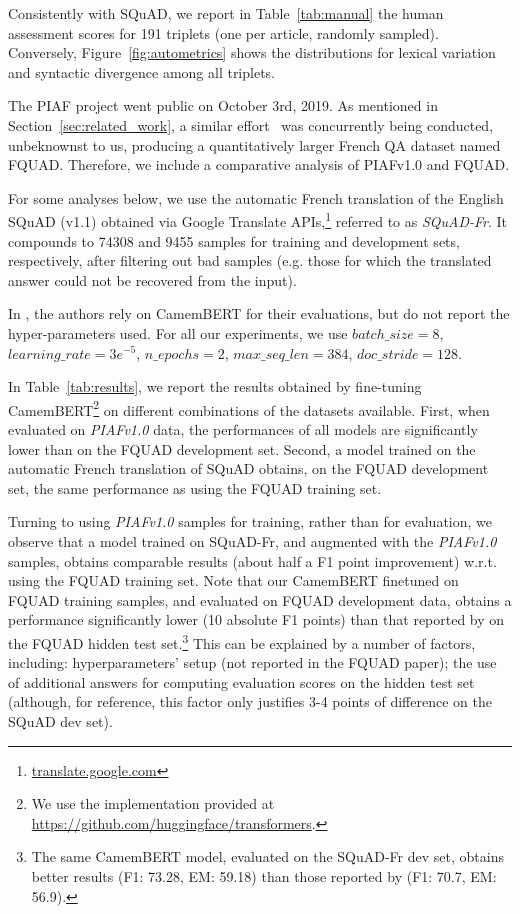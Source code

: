 \documentclass[10pt, a4paper]{article}
\begin{document}
Consistently with SQuAD, we report in Table~\ref{tab:manual}  the human assessment scores for 191 triplets (one per article, randomly sampled). Conversely, Figure~\ref{fig:autometrics} shows the distributions for lexical variation and syntactic divergence among all triplets.

The PIAF project went public on October 3rd, 2019. As mentioned in Section~\ref{sec:related_work}, a similar effort~\cite{d2020fquad} was concurrently being conducted, unbeknownst to us, producing a quantitatively larger French QA dataset named FQUAD. Therefore, we include a comparative analysis of PIAFv1.0 and FQUAD. 

For some analyses below, we use the automatic French translation of the English SQuAD (v1.1) obtained via Google Translate APIs,\footnote{\url{translate.google.com}} referred to as \emph{SQuAD-Fr}. It compounds to 74308 and 9455 samples for training and development sets, respectively, after filtering out bad samples (e.g. those for which the translated answer could not be recovered from the input).

In \cite{d2020fquad}, the authors rely on CamemBERT \cite{camembert} for their evaluations, but do not report the hyper-parameters used. For all our experiments, we use $batch\_size=8$, $learning\_rate=3e^{-5}$, $n\_epochs=2$, $max\_seq\_len=384$, $doc\_stride=128$.

In Table~\ref{tab:results}, we report the results obtained by fine-tuning CamemBERT\footnote{We use the implementation provided at \url{https://github.com/huggingface/transformers}.} on different combinations of the datasets available. First, when evaluated on \emph{PIAFv1.0} data, the performances of all models are significantly lower than on the FQUAD development set. Second, a model trained on the automatic French translation of SQuAD obtains, on the FQUAD development set, the same performance as using the FQUAD training set. 

Turning to using \emph{PIAFv1.0} samples for training, rather than for evaluation, we observe that a model trained on SQuAD-Fr, and augmented with the \emph{PIAFv1.0} samples, obtains comparable results (about half a F1 point improvement) w.r.t. using the FQUAD training set. Note that our CamemBERT finetuned on FQUAD training samples, and evaluated on FQUAD development data, obtains a performance significantly lower (10 absolute F1 points) than that reported by \cite{d2020fquad} on the FQUAD hidden test set.\footnote{The same CamemBERT model, evaluated on the SQuAD-Fr dev set, obtains better results (F1: 73.28, EM: 59.18) than those reported by \cite{d2020fquad} (F1: 70.7, EM: 56.9).} This can be explained by a number of factors, including: hyperparameters' setup (not reported in the FQUAD paper); the use of additional answers for computing evaluation scores on the hidden test set (although, for reference, this factor only justifies 3-4 points of difference on the SQuAD dev set). 
\end{document}
